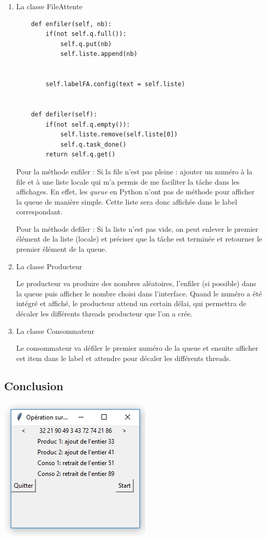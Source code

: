 \documentclass{article}
\begin{document}
\begin{enumerate}
\item La classe FileAttente

\begin{verbatim}
    def enfiler(self, nb):
        if(not self.q.full()):
            self.q.put(nb)
            self.liste.append(nb)


        self.labelFA.config(text = self.liste)


    def defiler(self):
        if(not self.q.empty()):
            self.liste.remove(self.liste[0])
            self.q.task_done()
        return self.q.get()
\end{verbatim}


Pour la méthode enfiler :
Si la file n'est pas pleine : ajouter un numéro à la file et à une liste locale qui m'a permis de me faciliter la tâche dans les affichages. En effet, les \textit{queue} en Python n'ont pas de méthode pour afficher la queue de manière simple. Cette liste sera donc affichée dans le label correspondant.

Pour la méthode defiler : 
Si la liste n'est pas vide, on peut enlever le premier élément de la liste (locale) et préciser que la tâche est terminée et retourner le premier élément de la queue.

\item La classe Producteur

Le producteur va produire des nombres aléatoires, l'enfiler (si possible) dans la queue puis afficher le nombre choisi dans l'interface. Quand le numéro a été intégré et affiché, le producteur attend un certain délai, qui permettra de décaler les différents threads producteur que l'on a crée.

\item La classe Consommateur

Le consommateur va défiler le premier numéro de la queue et ensuite afficher cet item dans le label et attendre pour décaler les différents threads.


\end{enumerate}

\subsection{Conclusion}

\begin{center}
  \includegraphics[scale=0.75]{Exercice23.png}
\end{center}
\end{document}
